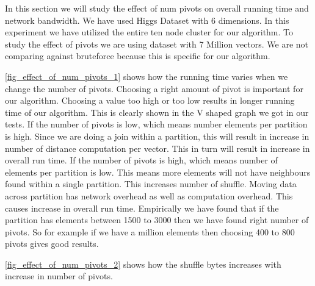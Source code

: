 In this section we will study the effect of num pivots on overall running
time and network bandwidth.
We have used Higgs Dataset with 6 dimensions. In this experiment we
have utilized the entire ten node cluster for our
algorithm. To study the effect of pivots we are using dataset with 7
Million vectors. We are not comparing against bruteforce because this
is specific for our algorithm.

\cref{fig_effect_of_num_pivots_1} shows how
the running time varies when we change the number of pivots. Choosing
a right amount of pivot is important for our algorithm. Choosing a
value too high or too low results in longer running time of our
algorithm. This is clearly shown in the V shaped graph we got in our
tests. If the number of pivots is low, which means number elements per
partition is high. Since we are doing a join within a partition, this
will result in increase in number of distance computation per
vector. This in turn will result in increase in overall run time. If
the number of pivots is high, which means number of elements per
partition is low. This means more elements will not have neighbours
found within a single partition. This increases number of
shuffle. Moving data across partition has network overhead as well as
computation overhead. This causes increase in overall run time.
Empirically we have found that if the partition has elements between
1500 to 3000 then we have found right number of pivots. So for example
if we have a million elements then choosing 400 to 800 pivots gives
good results.

\cref{fig_effect_of_num_pivots_2} shows how the shuffle bytes
increases with increase in number of pivots.

